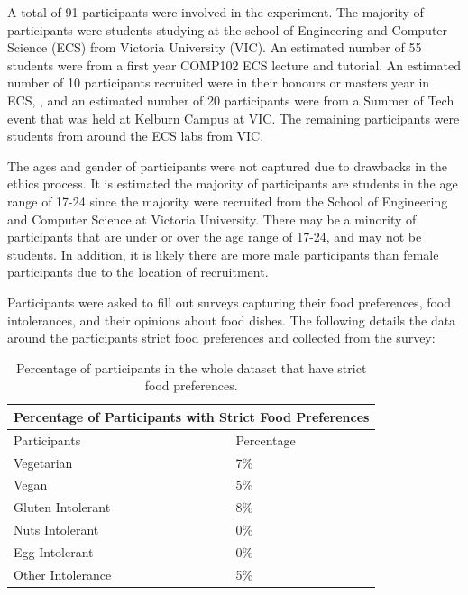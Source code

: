 A total of 91 participants were involved in the experiment. The majority of participants were students studying at the school of Engineering and Computer Science (ECS) from Victoria University (VIC). An estimated number of 55 students were from a first year COMP102 ECS lecture and tutorial. An estimated number of 10 participants recruited were in their honours or masters year in ECS, , and an estimated number of 20 participants were from a Summer of Tech event that was held at Kelburn Campus at VIC. The remaining participants were students from around the ECS labs from VIC.

The ages and gender of participants were not captured due to drawbacks in the ethics process. It is estimated the majority of participants are students in the age range of 17-24 since the majority were recruited from the School of Engineering and Computer Science at Victoria University. There may be a minority of participants that are under or over the age range of 17-24, and may not be students. In addition, it is likely there are more male participants than female participants due to the location of recruitment.

Participants were asked to fill out surveys capturing their food preferences, food intolerances, and their opinions about food dishes. The following details the data around the participants strict food preferences and collected from the survey:

\begin{table}[h!]
\centering
\begin{tabular}{|l|l|} 
 \hline
 \multicolumn{2}{|c|}{Percentage of Participants with Strict Food Preferences} \\
    \hline
    \hline
    Participants & Percentage \\
     \hline\hline
     Vegetarian & 7\%\\ [0.5ex] 
     \hline
     Vegan & 5\% \\
     \hline
     Gluten Intolerant & 8\% \\
     \hline
     Nuts Intolerant & 0\% \\
     \hline
     Egg Intolerant & 0\% \\
     \hline
     Other Intolerance & 5\% \\
     \hline
\end{tabular}
\caption{Percentage of participants in the whole dataset that have strict food preferences.}
\label{table:food_participants}
\end{table}


